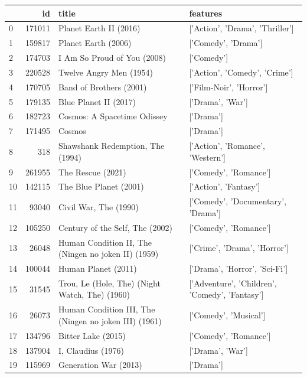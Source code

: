 
\begin{tabular}{lrll}
\toprule
 & id & title & features \\
\midrule
0 & 171011 & Planet Earth II (2016) & ['Action', 'Drama', 'Thriller'] \\
1 & 159817 & Planet Earth (2006) & ['Comedy', 'Drama'] \\
2 & 174703 & I Am So Proud of You (2008) & ['Comedy'] \\
3 & 220528 & Twelve Angry Men (1954) & ['Action', 'Comedy', 'Crime'] \\
4 & 170705 & Band of Brothers (2001) & ['Film-Noir', 'Horror'] \\
5 & 179135 & Blue Planet II (2017) & ['Drama', 'War'] \\
6 & 182723 & Cosmos: A Spacetime Odissey & ['Drama'] \\
7 & 171495 & Cosmos & ['Drama'] \\
8 & 318 & Shawshank Redemption, The (1994) & ['Action', 'Romance', 'Western'] \\
9 & 261955 & The Rescue (2021) & ['Comedy', 'Romance'] \\
10 & 142115 & The Blue Planet (2001) & ['Action', 'Fantasy'] \\
11 & 93040 & Civil War, The (1990) & ['Comedy', 'Documentary', 'Drama'] \\
12 & 105250 & Century of the Self, The (2002) & ['Comedy', 'Romance'] \\
13 & 26048 & Human Condition II, The (Ningen no joken II) (1959) & ['Crime', 'Drama', 'Horror'] \\
14 & 100044 & Human Planet (2011) & ['Drama', 'Horror', 'Sci-Fi'] \\
15 & 31545 & Trou, Le (Hole, The) (Night Watch, The) (1960) & ['Adventure', 'Children', 'Comedy', 'Fantasy'] \\
16 & 26073 & Human Condition III, The (Ningen no joken III) (1961) & ['Comedy', 'Musical'] \\
17 & 134796 & Bitter Lake (2015) & ['Comedy', 'Romance'] \\
18 & 137904 & I, Claudius (1976) & ['Drama', 'War'] \\
19 & 115969 & Generation War (2013) & ['Drama'] \\
\bottomrule
\end{tabular}
